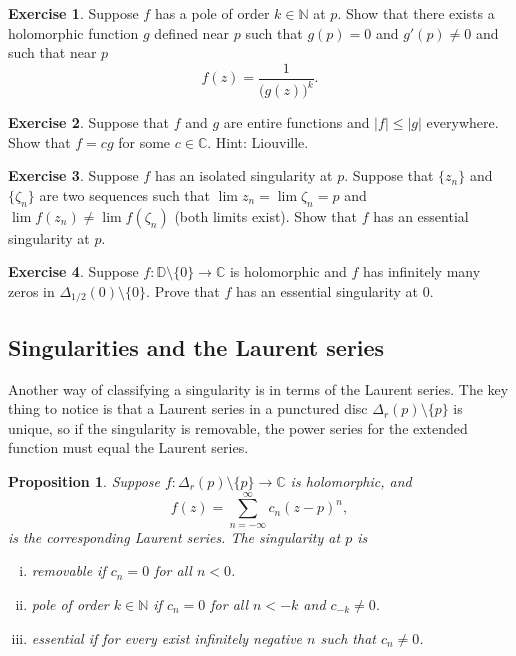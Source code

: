 \documentclass[12pt,openany]{book}
\newcommand{\sabs}[1]{\lvert {#1} \rvert}
\newcommand{\C}{{\mathbb{C}}}
\newcommand{\N}{{\mathbb{N}}}
\newcommand{\D}{{\mathbb{D}}}
\theoremstyle{plain}
\newtheorem{prop}[thm]{Proposition}
\theoremstyle{remark}
\theoremstyle{definition}
\newenvironment{exbox}{%
    \def\FrameCommand{\vrule width 1pt \relax\hspace {10pt}}%
    \MakeFramed {\advance \hsize -\width \FrameRestore }%
}{%
    \endMakeFramed
}
\theoremstyle{exercise}
\newtheorem{exercise}{Exercise}[section]
\theoremstyle{example}
\begin{document}
\begin{exbox}
\begin{exercise}
Suppose $f$ has a pole of order $k \in \N$ at $p$.
Show that there exists a holomorphic function $g$ defined near $p$
such that $g(p) = 0$ and $g'(p) \not= 0$ and such that near $p$
\begin{equation*}
f(z) = \frac{1}{{\bigl(g(z)\bigr)}^k} .
\end{equation*}
\end{exercise}

\begin{exercise}
Suppose that $f$ and $g$ are entire functions and $\sabs{f} \leq \sabs{g}$
everywhere.  Show that $f = c g$ for some $c \in \C$.  Hint: Liouville.
\end{exercise}

\begin{exercise}
Suppose $f$ has an isolated singularity at $p$.  Suppose that
$\{ z_n \}$ and $\{ \zeta_n \}$ are two sequences such that
$\lim z_n = \lim \zeta_n = p$ and $\lim f(z_n) \not= \lim f(\zeta_n)$
(both limits exist).
Show that $f$ has an essential singularity at $p$.
\end{exercise}

\begin{exercise}
Suppose $f \colon \D \setminus \{0\} \to \C$ is holomorphic and
$f$ has infinitely many zeros in $\Delta_{1/2}(0) \setminus \{ 0 \}$.
Prove that $f$ has an essential singularity at $0$.
\end{exercise}
\end{exbox}

\subsection{Singularities and the Laurent series}

Another way of classifying a singularity is in terms of the Laurent series.
The key thing to notice is that a Laurent series in a punctured
disc $\Delta_r(p) \setminus \{p\}$ is unique, so if the singularity is
removable, the power
series for the extended function must equal the Laurent series.

\begin{prop}
Suppose $f \colon \Delta_r(p) \setminus \{p\} \to \C$ is holomorphic,
and
\begin{equation*}
f(z) = \sum_{n=-\infty}^\infty c_n {(z-p)}^n ,
\end{equation*}
is the corresponding Laurent series.
The singularity at $p$ is
\begin{enumerate}[(i)]
\item \emph{removable} if $c_n = 0$ for all $n < 0$.
\item \emph{pole} of order $k \in \N$ if $c_n = 0$ for all $n < -k$ and
$c_{-k}
\not= 0$.
\item \emph{essential} if for every exist infinitely negative $n$
such that $c_n \not= 0$.
\end{enumerate}
\end{prop}
\end{document}
